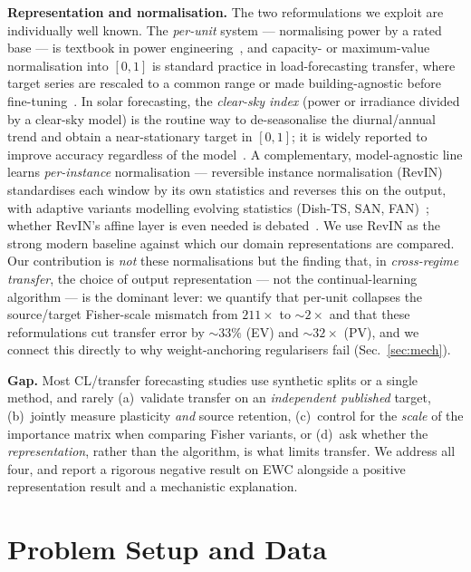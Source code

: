 \documentclass[conference]{IEEEtran}
\begin{document}
\textbf{Representation and normalisation.} The two reformulations we exploit are
individually well known. The \emph{per-unit} system --- normalising power by a
rated base --- is textbook in power engineering~\cite{Glover}, and capacity- or
maximum-value normalisation into $[0,1]$ is standard practice in load-forecasting
transfer, where target series are rescaled to a common range or made
building-agnostic before fine-tuning~\cite{TLnorm}. In solar forecasting, the
\emph{clear-sky index} (power or irradiance divided by a clear-sky model) is the
routine way to de-seasonalise the diurnal/annual trend and obtain a near-stationary
target in $[0,1]$; it is widely reported to improve accuracy regardless of the
model~\cite{Inman2013,Yang2018}. A complementary, model-agnostic line learns
\emph{per-instance} normalisation --- reversible instance normalisation
(RevIN)~\cite{RevIN2022} standardises each window by its own statistics and
reverses this on the output, with adaptive variants modelling evolving statistics
(Dish-TS, SAN, FAN)~\cite{DishTS2023,SAN2023,FAN2024}; whether RevIN's affine layer
is even needed is debated~\cite{RevINrole2026}. We use RevIN as the strong modern
baseline against which our domain representations are compared.
Our contribution is \emph{not} these normalisations
but the finding that, in \emph{cross-regime transfer}, the choice of output
representation --- not the continual-learning algorithm --- is the dominant lever:
we quantify that per-unit collapses the source/target Fisher-scale mismatch from
$211\times$ to ${\sim}2\times$ and that these reformulations cut transfer error by
${\sim}33\%$ (EV) and ${\sim}32\times$ (PV), and we connect this directly to why
weight-anchoring regularisers fail (Sec.~\ref{sec:mech}).

\textbf{Gap.} Most CL/transfer forecasting studies use synthetic splits or a
single method, and rarely (a)~validate transfer on an \emph{independent published}
target, (b)~jointly measure plasticity \emph{and} source retention, (c)~control
for the \emph{scale} of the importance matrix when comparing Fisher variants, or
(d)~ask whether the \emph{representation}, rather than the algorithm, is what
limits transfer. We address all four, and report a rigorous negative result on EWC
alongside a positive representation result and a mechanistic explanation.

\section{Problem Setup and Data}
\end{document}
